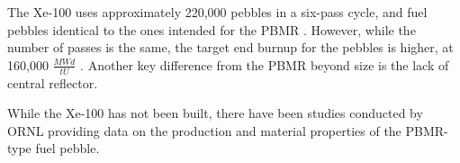 The Xe-100 uses approximately 220,000 pebbles in a six-pass cycle, and fuel pebbles identical to the ones intended for the PBMR \cite{harlan_x-energy_2018}.  However, while the number of passes is the same, the target end burnup for the pebbles is higher, at 160,000 $\frac{MWd}{tU}$ \cite{agnihotri_intrinsically_2017}.  Another key difference from the PBMR beyond size is the lack of central reflector.

While the Xe-100 has not been built, there have been studies conducted by ORNL providing data on the production and material properties of the PBMR-type fuel pebble.
